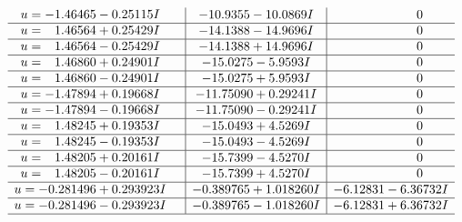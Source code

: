 \documentclass[1p]{elsarticle_modified}
\theoremstyle{definition}
\begin{document}
$$\begin{array}{c|c|c}
\begin{aligned}
u &= -1.46465 - 0.25115 I\end{aligned}
 & -10.9355 - 10.0869 I & \phantom{-0.000000 } 0 \\ \hline\begin{aligned}
u &= \phantom{-}1.46564 + 0.25429 I\end{aligned}
 & -14.1388 - 14.9696 I & \phantom{-0.000000 } 0 \\ \hline\begin{aligned}
u &= \phantom{-}1.46564 - 0.25429 I\end{aligned}
 & -14.1388 + 14.9696 I & \phantom{-0.000000 } 0 \\ \hline\begin{aligned}
u &= \phantom{-}1.46860 + 0.24901 I\end{aligned}
 & -15.0275 - 5.9593 I & \phantom{-0.000000 } 0 \\ \hline\begin{aligned}
u &= \phantom{-}1.46860 - 0.24901 I\end{aligned}
 & -15.0275 + 5.9593 I & \phantom{-0.000000 } 0 \\ \hline\begin{aligned}
u &= -1.47894 + 0.19668 I\end{aligned}
 & -11.75090 + 0.29241 I & \phantom{-0.000000 } 0 \\ \hline\begin{aligned}
u &= -1.47894 - 0.19668 I\end{aligned}
 & -11.75090 - 0.29241 I & \phantom{-0.000000 } 0 \\ \hline\begin{aligned}
u &= \phantom{-}1.48245 + 0.19353 I\end{aligned}
 & -15.0493 + 4.5269 I & \phantom{-0.000000 } 0 \\ \hline\begin{aligned}
u &= \phantom{-}1.48245 - 0.19353 I\end{aligned}
 & -15.0493 - 4.5269 I & \phantom{-0.000000 } 0 \\ \hline\begin{aligned}
u &= \phantom{-}1.48205 + 0.20161 I\end{aligned}
 & -15.7399 - 4.5270 I & \phantom{-0.000000 } 0 \\ \hline\begin{aligned}
u &= \phantom{-}1.48205 - 0.20161 I\end{aligned}
 & -15.7399 + 4.5270 I & \phantom{-0.000000 } 0 \\ \hline\begin{aligned}
u &= -0.281496 + 0.293923 I\end{aligned}
 & -0.389765 + 1.018260 I & -6.12831 - 6.36732 I \\ \hline\begin{aligned}
u &= -0.281496 - 0.293923 I\end{aligned}
 & -0.389765 - 1.018260 I & -6.12831 + 6.36732 I\\
 \hline 
 \end{array}$$\newpage
\end{document}

